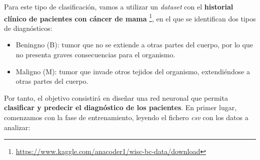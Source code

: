 \documentclass [a4paper] {article}
\begin{document}
Para este tipo de clasificación, vamos a utilizar un \textit{dataset} con el \textbf{historial clínico de pacientes con cáncer de mama} \footnote{\url{https://www.kaggle.com/anacoder1/wisc-bc-data/download}}, en el que se identifican dos tipos de diagnósticos:
\begin{itemize}
  \item Beningno (B): tumor que no se extiende a otras partes del cuerpo, por lo que no presenta graves consecuencias para el organismo.
  \item Maligno (M): tumor que invade otros tejidos del organismo, extendiéndose a otras partes del cuerpo.
\end{itemize}

Por tanto, el objetivo consistirá en diseñar una red neuronal que permita \textbf{clasificar y predecir el diagnóstico de los pacientes}. En primer lugar, comenzamos con la fase de entrenamiento, leyendo el fichero \textit{csv} con los datos a analizar:
\end{document}
